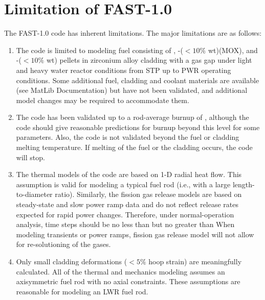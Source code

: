 \section{Limitation of FAST-1.0} \label{section:limitations}
The FAST-1.0 code has inherent limitations. The major limitations are as follows:
\begin{enumerate}

    \item The code is limited to modeling fuel consisting of \UO, \UO-($<10\percent$
        wt\percent)(MOX), and \UO-($<10\percent$
        wt\percent{}) pellets in zirconium alloy cladding with a gas gap
        under light and heavy water reactor conditions from STP up to PWR operating conditions. Some
        additional fuel, cladding and coolant materials are available (see MatLib Documentation) but
        have not been validated, and additional model changes may be required to accommodate them.

    \item The code has been validated up to a rod-average burnup of , although
        the code should give reasonable predictions for burnup beyond this level for some
        parameters.  Also, the code is not validated beyond the fuel or cladding melting
        temperature. If melting of the fuel or the cladding occurs, the code will stop.

    \item The thermal models of the code are based on 1-D radial heat flow. This assumption is valid
        for modeling a typical fuel rod (i.e., with a large length-to-diameter ratio). Similarly,
        the fission gas release models are based on steady-state and slow power ramp data and do not
        reflect release rates expected for rapid power changes. Therefore, under normal-operation
        analysis, time steps should be no less than  but no greater than
         When modeling transients or power ramps, fission gas release model will
        not allow for re-solutioning of the gases.

    \item Only small cladding deformations ($<5\percent$ hoop strain) are meaningfully calculated.
        All of the thermal and mechanics modeling assumes an axisymmetric fuel rod with no axial
        constraints. These assumptions are reasonable for modeling an LWR fuel rod.


\end{enumerate}
